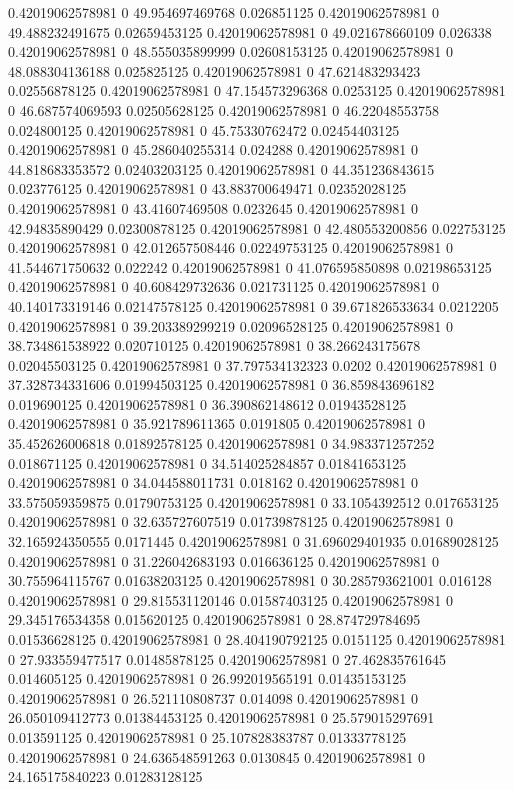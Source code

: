 0.42019062578981 0 49.954697469768 0.026851125
0.42019062578981 0 49.488232491675 0.02659453125
0.42019062578981 0 49.021678660109 0.026338
0.42019062578981 0 48.555035899999 0.02608153125
0.42019062578981 0 48.088304136188 0.025825125
0.42019062578981 0 47.621483293423 0.02556878125
0.42019062578981 0 47.154573296368 0.0253125
0.42019062578981 0 46.687574069593 0.02505628125
0.42019062578981 0 46.22048553758 0.024800125
0.42019062578981 0 45.75330762472 0.02454403125
0.42019062578981 0 45.286040255314 0.024288
0.42019062578981 0 44.818683353572 0.02403203125
0.42019062578981 0 44.351236843615 0.023776125
0.42019062578981 0 43.883700649471 0.02352028125
0.42019062578981 0 43.41607469508 0.0232645
0.42019062578981 0 42.94835890429 0.02300878125
0.42019062578981 0 42.480553200856 0.022753125
0.42019062578981 0 42.012657508446 0.02249753125
0.42019062578981 0 41.544671750632 0.022242
0.42019062578981 0 41.076595850898 0.02198653125
0.42019062578981 0 40.608429732636 0.021731125
0.42019062578981 0 40.140173319146 0.02147578125
0.42019062578981 0 39.671826533634 0.0212205
0.42019062578981 0 39.203389299219 0.02096528125
0.42019062578981 0 38.734861538922 0.020710125
0.42019062578981 0 38.266243175678 0.02045503125
0.42019062578981 0 37.797534132323 0.0202
0.42019062578981 0 37.328734331606 0.01994503125
0.42019062578981 0 36.859843696182 0.019690125
0.42019062578981 0 36.390862148612 0.01943528125
0.42019062578981 0 35.921789611365 0.0191805
0.42019062578981 0 35.452626006818 0.01892578125
0.42019062578981 0 34.983371257252 0.018671125
0.42019062578981 0 34.514025284857 0.01841653125
0.42019062578981 0 34.044588011731 0.018162
0.42019062578981 0 33.575059359875 0.01790753125
0.42019062578981 0 33.1054392512 0.017653125
0.42019062578981 0 32.635727607519 0.01739878125
0.42019062578981 0 32.165924350555 0.0171445
0.42019062578981 0 31.696029401935 0.01689028125
0.42019062578981 0 31.226042683193 0.016636125
0.42019062578981 0 30.755964115767 0.01638203125
0.42019062578981 0 30.285793621001 0.016128
0.42019062578981 0 29.815531120146 0.01587403125
0.42019062578981 0 29.345176534358 0.015620125
0.42019062578981 0 28.874729784695 0.01536628125
0.42019062578981 0 28.404190792125 0.0151125
0.42019062578981 0 27.933559477517 0.01485878125
0.42019062578981 0 27.462835761645 0.014605125
0.42019062578981 0 26.992019565191 0.01435153125
0.42019062578981 0 26.521110808737 0.014098
0.42019062578981 0 26.050109412773 0.01384453125
0.42019062578981 0 25.579015297691 0.013591125
0.42019062578981 0 25.107828383787 0.01333778125
0.42019062578981 0 24.636548591263 0.0130845
0.42019062578981 0 24.165175840223 0.01283128125
